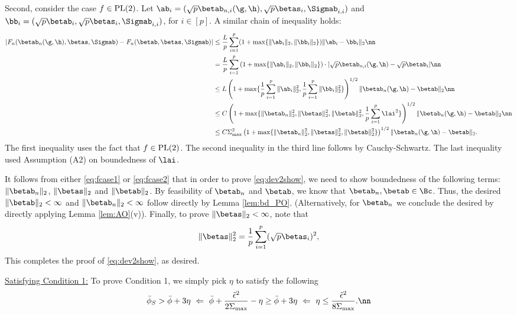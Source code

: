 Second, consider the case $f\in\rm{PL}(2)$. Let $\ab_i=(\sqrt{p}\betab_{n,i}(\g,\h),\sqrt{p}\betas_i,\Sigmab_{i,i})$ and $\bb_i=(\sqrt{p}\betab_i,\sqrt{p}\betas_i,\Sigmab_{i,i})$, for $i\in[p]$. A similar chain of inequality holds:
\begin{align}
|F_n(\betab_n(\g,\h),\betas,\Sigmab) - F_n(\betab,\betas,\Sigmab)| &\leq \frac{L}{p}\sum_{i=1}^p (1+\max\{\|\ab_i\|_2,\|\bb_i\|_2\})\|\ab_i-\bb_i\|_2\nn \\
&= \frac{L}{p}\sum_{i=1}^p \left(1+\max\{\|\ab_i\|_2,\|\bb_i\|_2\}\right)\cdot|\sqrt{p}\betab_{n,i}(\g,\h) - \sqrt{p}\betab_i|\nn\\
&\leq L\left(1+\max\{\frac{1}{p}\sum_{i=1}^p \|\ab_i\|_2^{2},\frac{1}{p}\sum_{i=1}^p\|\bb_i\|_2^{2}\} \right)^{1/2}{\|\betab_{n}(\g,\h) - \betab\|_2}\nn\\
&\leq C\left(1+\max\{\|\betab_{n}\|_2^2,\|\betas\|_2^2,\|\betab\|_2^2,\frac{1}{p}\sum_{i=1}^p\lai^2\} \right)^{1/2}{\|\betab_{n}(\g,\h) - \betab\|_2}\nn\\
&\leq C\Sigma_{\max}^2\left(1+\max\{\|\betab_{n}\|_2^2,\|\betas\|_2^2,\|\betab\|_2^2\} \right)^{1/2}{\|\betab_{n}(\g,\h) - \betab\|_2}.\label{eq:fcase2}
\end{align}
The first inequality uses the fact that $f\in\rm{PL}(2)$. The second inequality in the third line follows by Cauchy-Schwartz. The last inequality used Assumption (A2) on boundedness of $\lai$.


It follows from either \eqref{eq:fcase1} or \eqref{eq:fcase2} that in order to prove \eqref{eq:dev2show}, we need to show boundedness of the following terms: $\|\betab_n\|_2$, $\|\betas\|_2$ and $\|\betab\|_2$. By feasibility of $\betab_n$ and $\betab$, we know that $\betab_n,\betab\in\Bc$. Thus, the desired $\|\betab\|_2<\infty$ and $\|\betab_n\|_2<\infty$ follow directly by Lemma \ref{lem:bd_PO}. (Alternatively, for $\betab_n$ we conclude the desired by directly applying Lemma \ref{lem:AO}(v)). Finally, to prove $\|\betas\|_2<\infty$, note that
$$
\|\betas\|_2^2 =\frac{1}{p}\sum_{i=1}^p(\sqrt{p}\betas_i)^2,
$$
 This completes the proof of \eqref{eq:dev2show}, as desired.


\vspace{5pt}
\noindent\underline{Satisfying Condition 1:} To prove Condition 1, we simply pick $\eta$ to satisfy the following
\begin{align}
\bar\phi_S > \bar\phi + 3 \eta ~\Leftarrow~ \bar\phi + \frac{\tilde\epsilon^2}{2\Sigma_{\max}} - \eta \geq \bar\phi + 3 \eta ~\Leftarrow~ \eta \leq \frac{\tilde\epsilon^2}{8\Sigma_{\max}}.\nn
\end{align}


